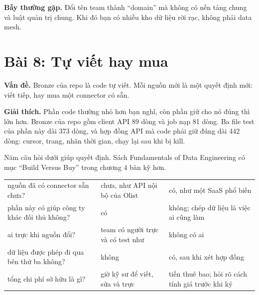 \begin{luuy}
\textbf{Bẫy thường gặp.} Đổi tên team thành ``domain'' mà không có nền tảng chung và luật quản trị chung. Khi đó bạn có nhiều kho dữ liệu rời rạc, không phải data mesh.
\end{luuy}

\section{Bài 8: Tự viết hay mua}

\textbf{Vấn đề.} Bronze của repo là code tự viết. Mỗi nguồn mới là một quyết định mới: viết tiếp, hay mua một connector có sẵn.

\textbf{Giải thích.} Phần code thường nhỏ hơn bạn nghĩ, còn phần giữ cho nó đúng thì lớn hơn. Bronze của repo gồm client API 89 dòng và job nạp 81 dòng. Ba file test của phần này dài 373 dòng, và hợp đồng API mà code phải giữ đúng dài 442 dòng: cursor, trang, nhãn thời gian, chạy lại sau khi bị kill.

Năm câu hỏi dưới giúp quyết định. Sách Fundamentals of Data Engineering có mục ``Build Versus Buy'' trong chương 4 bàn kỹ hơn.

\begin{xltabular}{\textwidth}{@{}P{4.6cm} L L@{}}
\toprule
{} &  &  \\
\midrule
\endhead
\bottomrule
\endfoot
nguồn đã có connector sẵn chưa? & chưa, như API nội bộ của Olist & có, như một SaaS phổ biến \\
phần này có giúp công ty khác đối thủ không? & có & không; chép dữ liệu là việc ai cũng làm \\
ai trực khi nguồn đổi? & team có người trực và có test như  & không có ai \\
dữ liệu được phép đi qua bên thứ ba không? & không & có, sau khi xét hợp đồng \\
tổng chi phí sở hữu là gì? & giờ kỹ sư để viết, sửa và trực & tiền thuê bao; hỏi rõ cách tính giá trước khi ký \\
\end{xltabular}

